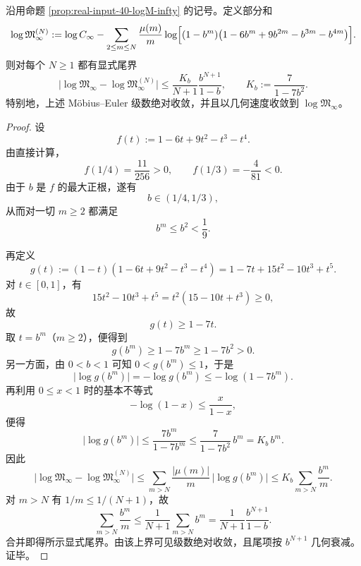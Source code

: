 \begin{theorem}\label{thm:xi-real-input40-logM-infty-truncation-bound}
沿用命题 \ref{prop:real-input-40-logM-infty} 的记号。定义部分和
\[
\log\mathfrak M_\infty^{(N)}
:=
\log C_\infty
-\sum_{2\le m\le N}\frac{\mu(m)}{m}
\log\Bigl[(1-b^m)\bigl(1-6b^m+9b^{2m}-b^{3m}-b^{4m}\bigr)\Bigr].
\]
则对每个 \(N\ge 1\) 都有显式尾界
\[
\boxed{\;
\bigl|\log\mathfrak M_\infty-\log\mathfrak M_\infty^{(N)}\bigr|
\le
\frac{K_b}{N+1}\frac{b^{N+1}}{1-b},
\qquad
K_b:=\frac{7}{1-7b^2}.\;}
\]
特别地，上述 Möbius--Euler 级数绝对收敛，并且以几何速度收敛到 \(\log\mathfrak M_\infty\)。
\end{theorem}
\begin{proof}
设
\[
f(t):=1-6t+9t^2-t^3-t^4.
\]
由直接计算，
\[
f(1/4)=\frac{11}{256}>0,
\qquad
f(1/3)=-\frac{4}{81}<0.
\]
由于 \(b\) 是 \(f\) 的最大正根，遂有
\[
b\in(1/4,1/3),
\]
从而对一切 \(m\ge 2\) 都满足
\[
b^m\le b^2<\frac19.
\]

再定义
\[
g(t):=(1-t)(1-6t+9t^2-t^3-t^4)=1-7t+15t^2-10t^3+t^5.
\]
对 \(t\in[0,1]\)，有
\[
15t^2-10t^3+t^5=t^2(15-10t+t^3)\ge 0,
\]
故
\[
g(t)\ge 1-7t.
\]
取 \(t=b^m\)（\(m\ge 2\)），便得到
\[
g(b^m)\ge 1-7b^m\ge 1-7b^2>0.
\]
另一方面，由 \(0<b<1\) 可知 \(0<g(b^m)\le 1\)，于是
\[
\bigl|\log g(b^m)\bigr|
=-\log g(b^m)
\le -\log(1-7b^m).
\]
再利用 \(0\le x<1\) 时的基本不等式
\[
-\log(1-x)\le \frac{x}{1-x},
\]
便得
\[
\bigl|\log g(b^m)\bigr|
\le \frac{7b^m}{1-7b^m}
\le \frac{7}{1-7b^2}\,b^m
=K_b\,b^m.
\]
因此
\[
\bigl|\log\mathfrak M_\infty-\log\mathfrak M_\infty^{(N)}\bigr|
\le
\sum_{m>N}\frac{|\mu(m)|}{m}\,\bigl|\log g(b^m)\bigr|
\le
K_b\sum_{m>N}\frac{b^m}{m}.
\]
对 \(m>N\) 有 \(1/m\le 1/(N+1)\)，故
\[
\sum_{m>N}\frac{b^m}{m}
\le
\frac{1}{N+1}\sum_{m>N}b^m
=
\frac{1}{N+1}\frac{b^{N+1}}{1-b}.
\]
合并即得所示显式尾界。由该上界可见级数绝对收敛，且尾项按 \(b^{N+1}\) 几何衰减。证毕。
\end{proof}
